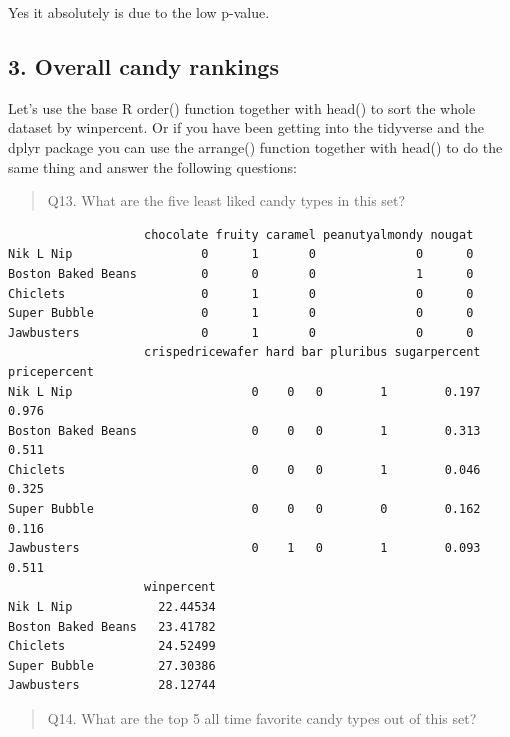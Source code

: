 \documentclass[
  letterpaper,
  DIV=11,
  numbers=noendperiod]{scrartcl}
\newenvironment{Shaded}{\begin{snugshade}}{\end{snugshade}}
\newcommand{\AttributeTok}[1]{\textcolor[rgb]{0.40,0.45,0.13}{#1}}
\newcommand{\DecValTok}[1]{\textcolor[rgb]{0.68,0.00,0.00}{#1}}
\newcommand{\FunctionTok}[1]{\textcolor[rgb]{0.28,0.35,0.67}{#1}}
\newcommand{\NormalTok}[1]{\textcolor[rgb]{0.00,0.23,0.31}{#1}}
\newcommand{\SpecialCharTok}[1]{\textcolor[rgb]{0.37,0.37,0.37}{#1}}
\begin{document}
Yes it absolutely is due to the low p-value.

\subsection{3. Overall candy rankings}\label{overall-candy-rankings}

Let's use the base R order() function together with head() to sort the
whole dataset by winpercent. Or if you have been getting into the
tidyverse and the dplyr package you can use the arrange() function
together with head() to do the same thing and answer the following
questions:

\begin{quote}
Q13. What are the five least liked candy types in this set?
\end{quote}

\begin{Shaded}
\end{Shaded}

\begin{verbatim}
                   chocolate fruity caramel peanutyalmondy nougat
Nik L Nip                  0      1       0              0      0
Boston Baked Beans         0      0       0              1      0
Chiclets                   0      1       0              0      0
Super Bubble               0      1       0              0      0
Jawbusters                 0      1       0              0      0
                   crispedricewafer hard bar pluribus sugarpercent pricepercent
Nik L Nip                         0    0   0        1        0.197        0.976
Boston Baked Beans                0    0   0        1        0.313        0.511
Chiclets                          0    0   0        1        0.046        0.325
Super Bubble                      0    0   0        0        0.162        0.116
Jawbusters                        0    1   0        1        0.093        0.511
                   winpercent
Nik L Nip            22.44534
Boston Baked Beans   23.41782
Chiclets             24.52499
Super Bubble         27.30386
Jawbusters           28.12744
\end{verbatim}

\begin{quote}
Q14. What are the top 5 all time favorite candy types out of this set?
\end{quote}
\end{document}
